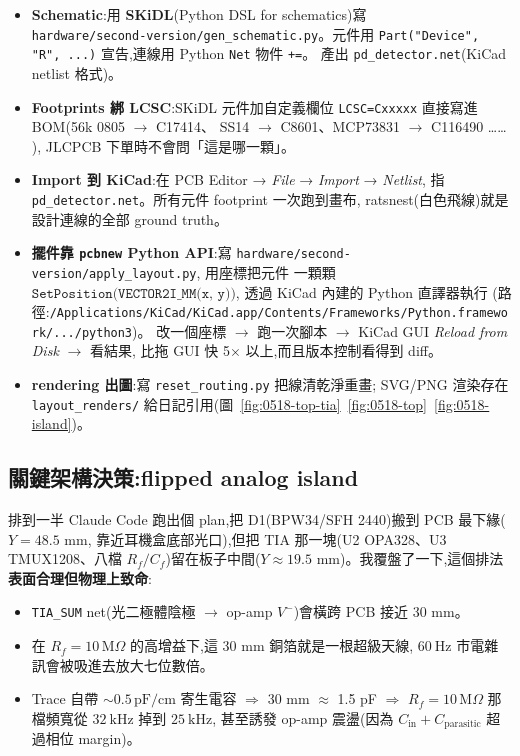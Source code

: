 \begin{itemize}[leftmargin=2em,itemsep=0pt]
  \item \textbf{Schematic}:用 \textbf{SKiDL}(Python DSL for schematics)寫\\
        \texttt{hardware/second-version/gen\_schematic.py}。元件用 \texttt{Part("Device", "R", ...)}
        宣告,連線用 Python \texttt{Net} 物件 \texttt{+=}。
        產出 \texttt{pd\_detector.net}(KiCad netlist 格式)。
  \item \textbf{Footprints 綁 LCSC}:SKiDL 元件加自定義欄位
        \texttt{LCSC=Cxxxxx} 直接寫進 BOM(56k 0805 \(\to\) C17414、
        SS14 \(\to\) C8601、MCP73831 \(\to\) C116490 …… ),
        JLCPCB 下單時不會問「這是哪一顆」。
  \item \textbf{Import 到 KiCad}:在 PCB Editor → \emph{File} → \emph{Import} → \emph{Netlist},
        指 \texttt{pd\_detector.net}。所有元件 footprint 一次跑到畫布,
        ratsnest(白色飛線)就是設計連線的全部 ground truth。
  \item \textbf{擺件靠 \texttt{pcbnew} Python API}:寫
        \texttt{hardware/second-version/apply\_layout.py},
        用座標把元件 一顆顆 \(\texttt{SetPosition(VECTOR2I\_MM(x, y))}\),
        透過 KiCad 內建的 Python 直譯器執行
        (路徑:\texttt{/Applications/KiCad/KiCad.app/Contents/Frameworks/Python.framework/.../python3})。
        改一個座標 \(\to\) 跑一次腳本 \(\to\) KiCad GUI \emph{Reload from Disk} \(\to\) 看結果,
        比拖 GUI 快 5\(\times\) 以上,而且版本控制看得到 diff。
  \item \textbf{rendering 出圖}:寫 \texttt{reset\_routing.py} 把線清乾淨重畫;
        SVG/PNG 渲染存在 \texttt{layout\_renders/} 給日記引用(圖~\ref{fig:0518-top-tia}~\ref{fig:0518-top}~\ref{fig:0518-island})。
\end{itemize}

\subsection*{關鍵架構決策:flipped analog island}

排到一半 Claude Code 跑出個 plan,把 D1(BPW34/SFH 2440)搬到 PCB 最下緣(\(Y=48.5\) mm,
靠近耳機盒底部光口),但把 TIA 那一塊(U2 OPA328、U3 TMUX1208、八檔 \(R_f / C_f\))留在板子中間(\(Y \approx 19.5\) mm)。我覆盤了一下,這個排法\textbf{表面合理但物理上致命}:

\begin{itemize}[leftmargin=2em,itemsep=0pt]
  \item \texttt{TIA\_SUM} net(光二極體陰極 \(\to\) op-amp \(V^-\))會橫跨 PCB 接近 30 mm。
  \item 在 \(R_f = 10\,\mathrm{M}\Omega\) 的高增益下,這 30 mm 銅箔就是一根超級天線,
        \(\SI{60}{\hertz}\) 市電雜訊會被吸進去放大七位數倍。
  \item Trace 自帶 \(\sim 0.5\,\mathrm{pF/cm}\) 寄生電容 \(\Rightarrow\) 30 mm \(\approx\) 1.5 pF \(\Rightarrow\)
        \(R_f = 10\,\mathrm{M}\Omega\) 那檔頻寬從 \(\SI{32}{\kilo\hertz}\) 掉到 \(\SI{25}{\kilo\hertz}\),
        甚至誘發 op-amp 震盪(因為 \(C_\text{in} + C_\text{parasitic}\) 超過相位 margin)。
\end{itemize}

